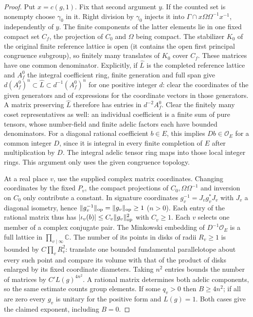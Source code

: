 \begin{proof}
Put $x=c(g,1)$. Fix that second argument $y$. If the counted set
is nonempty choose $\gamma_0$ in it. Right division by $\gamma_0$
injects it into $\Gamma\cap x\Omega\Omega^{-1}x^{-1}$, independently
of $y$. The finite components of the latter elements lie in one fixed
compact set $C_f$, the projection of $C_0$ and $\Omega$ being compact.
The stabilizer $K_0$ of the original finite reference lattice is open
(it contains the open first principal congruence subgroup), so finitely
many translates of $K_0$ cover $C_f$. These matrices have one common
denominator. Explicitly, if $\widehat L$ is the completed reference
lattice and $A_f^0$ the integral coefficient ring, finite generation
and full span give
$d(A_f^0)^n\subset\widehat L\subset d^{-1}(A_f^0)^n$ for one positive
integer $d$: clear the coordinates of the given generators and
of expressions for the coordinate vectors in those generators.
A matrix preserving $\widehat L$ therefore has entries in
$d^{-2}A_f^0$. Clear the finitely many coset representatives as
well: an individual coefficient is a finite sum of pure tensors,
whose number-field and finite adelic factors each have bounded
denominators. For a diagonal rational coefficient $b\in E$, this
implies $D b\in\mathcal O_E$ for a common integer $D$, since it
is integral in every finite completion of $E$ after multiplication
by $D$. The integral adelic tensor ring maps into those local
integer rings. This argument only uses the given congruence topology.

At a real place $v$, use the supplied complex matrix coordinates.
Changing coordinates by the fixed $P_v$, the compact projections
of $C_0,\Omega\Omega^{-1}$ and inversion on $C_0$ only contribute
a constant. In signature coordinates $g_v^{-1}=J_v g_v^*J_v$
with $J_v$ a diagonal isometry, hence
$\|g_v^{-1}\|_{\rm op}=\|g_v\|_{\rm op}\ge1$ ($n>0$).
Each entry of the rational matrix thus has
$|\iota_v(b)|\le C_v\|g_v\|_{\rm op}^2$ with $C_v\ge1$.
Each $v$ selects one member of a complex conjugate pair. The
Minkowski embedding of $D^{-1}\mathcal O_E$ is a full lattice in
$\prod_{v\mid\infty}\mathbb C$. The number of its points in disks
of radii $R_v\ge1$ is bounded by $C\prod_v R_v^2$: translate one
bounded fundamental parallelotope about every such point and compare
its volume with that of the product of disks enlarged by its fixed
coordinate diameters. Taking $n^2$ entries bounds the number of
matrices by $C' L(g)^{4n^2}$. A rational matrix determines both
adelic components, so the same estimate counts group elements.
If some $q_v>0$ then $B\ge4n^2$; if all are zero every $g_v$ is
unitary for the positive form and $L(g)=1$. Both cases give the
claimed exponent, including $B=0$.
\end{proof}

